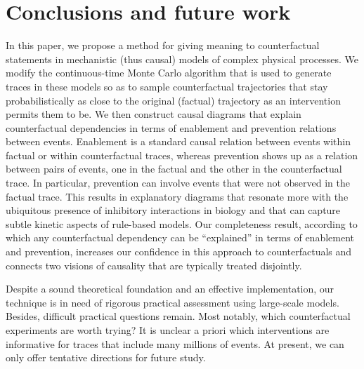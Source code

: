 
\section*{Conclusions and future work}

In this paper, we propose a method for giving meaning to
counterfactual statements in mechanistic (thus causal) models of
complex physical processes.  We modify the continuous-time Monte Carlo
algorithm that is used to generate traces in these models so as to
sample counterfactual trajectories that stay probabilistically as
close to the original (factual) trajectory as an intervention permits
them to be. We then construct causal diagrams that explain
counterfactual dependencies in terms of enablement and prevention
relations between events. Enablement is a standard causal relation
between events within factual or within counterfactual traces, whereas
prevention shows up as a relation between pairs of events, one in the
factual and the other in the counterfactual trace. In particular,
prevention can involve events that were not observed in the factual
trace. This results in explanatory diagrams that resonate more with
the ubiquitous presence of inhibitory interactions in biology and that
can capture subtle kinetic aspects of rule-based models.  Our
completeness result, according to which any counterfactual dependency
can be ``explained'' in terms of enablement and prevention, increases
our confidence in this approach to counterfactuals and connects two
visions of causality that are typically treated disjointly.

Despite a sound theoretical foundation and an effective
implementation, our technique is in need of rigorous practical
assessment using large-scale models. Besides, difficult practical
questions remain. Most notably, which counterfactual experiments are
worth trying? It is unclear a priori which interventions are
informative for traces that include many millions of events. At
present, we can only offer tentative directions for future study.

